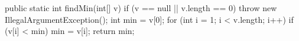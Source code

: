 \begin{unipdcode}[language=Java,
  basicstyle=\ttfamily\scriptsize, numbers=none,
  xleftmargin=0.6em, xrightmargin=0.6em,
  framexleftmargin=0.2em]
public static int findMin(int[] v) {
    if (v == null || v.length == 0)
        throw new IllegalArgumentException();
    int min = v[0];
    for (int i = 1; i < v.length; i++)
        if (v[i] < min) min = v[i];
    return min;
}
\end{unipdcode}
